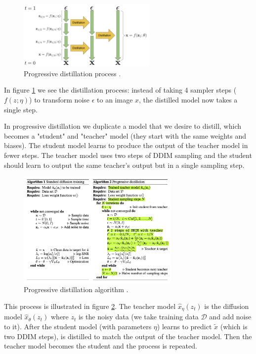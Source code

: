 \begin{figure}
    \centering
    \includegraphics[width=0.6\textwidth]{images/imagen_video/v_prediction.png}
    \caption{Progressive distillation process \cite{v_prediction}.}
    \label{fig:progressive_distillation}
\end{figure}

In figure \ref{fig:progressive_distillation} we see the distillation process: instead of taking 4 sampler steps ($f(z; \eta)$) to transform noise $\epsilon$ to an image $x$, the distilled model now takes a single step.

In progressive distillation we duplicate a model that we desire to distill, which becomes a "student" and "teacher" model (they start with the same weights and biases). The student model learns to produce the output of the teacher model in fewer steps. The teacher model uses two steps of DDIM sampling and the student should learn to output the same teacher's output but in a single sampling step.

\begin{figure}
    \centering
    \includegraphics[width=0.7\textwidth]{images/imagen_video/progressive_distillation.png}
    \caption{Progressive distillation algorithm \cite{v_prediction}. }
    \label{fig:progressive_distillation_algorithm}
\end{figure}

This process is illustrated in figure \ref{fig:progressive_distillation_algorithm}. The teacher model $\hat{x}_{\eta} (z_t)$ is the diffusion model $\hat{x}_{\theta} (z_t)$ where $z_t$ is the noisy data (we take training data $\mathcal{D}$ and add noise to it). After the student model (with parameters $\eta$) learns to predict $\tilde{x}$ (which is two DDIM steps), is distilled to match the output of the teacher model. Then the teacher model becomes the student and the process is repeated.

